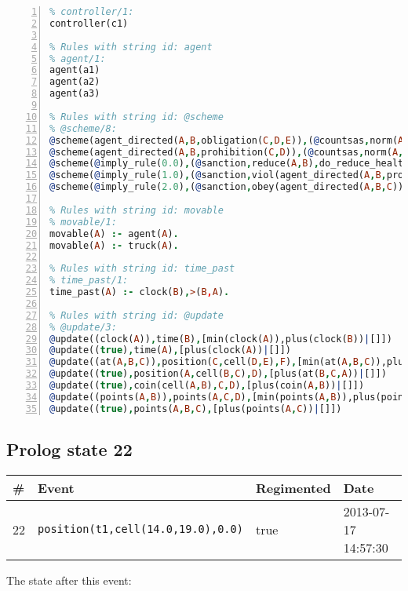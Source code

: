 \documentclass[11pt]{article}\usepackage[utf8]{inputenc}\usepackage{geometry}
\begin{document}
\begin{lstlisting}[language=Prolog, numbers=left]
% Rules with string id: controller
% controller/1:
controller(c1)

% Rules with string id: agent
% agent/1:
agent(a1)
agent(a2)
agent(a3)

% Rules with string id: @scheme
% @scheme/8:
@scheme(agent_directed(A,B,obligation(C,D,E)),(@countsas,norm(A,B,F,obligation(C,D,E)),F),false,(listTrue(C)),(time_past(D)),false,[plus(viol(agent_directed(A,B,obligation(C,D,E))))|[]],[plus(obey(agent_directed(A,B,obligation(C,D,E))))|[]])
@scheme(agent_directed(A,B,prohibition(C,D)),(@countsas,norm(A,B,E,prohibition(C,D)),E),(listTrue(C)),false,(false),false,[plus(viol(agent_directed(A,B,prohibition(C,D))))|[]],[plus(obey(agent_directed(A,B,prohibition(C,D))))|[]])
@scheme(@imply_rule(0.0),(@sanction,reduce(A,B),do_reduce_health(A,B),notifyAgent(A,changed(status))),true,false,false,false,[min(reduce(A,B))|[]],[])
@scheme(@imply_rule(1.0),(@sanction,viol(agent_directed(A,B,prohibition(C,D))),do_sanction(D)),true,false,false,false,[min(viol(agent_directed(A,B,prohibition(C,D))))|[]],[])
@scheme(@imply_rule(2.0),(@sanction,obey(agent_directed(A,B,C))),true,false,false,false,[min(obey(agent_directed(A,B,C)))|[]],[])

% Rules with string id: movable
% movable/1:
movable(A) :- agent(A).
movable(A) :- truck(A).

% Rules with string id: time_past
% time_past/1:
time_past(A) :- clock(B),>(B,A).

% Rules with string id: @update
% @update/3:
@update((clock(A)),time(B),[min(clock(A)),plus(clock(B))|[]])
@update((true),time(A),[plus(clock(A))|[]])
@update((at(A,B,C)),position(C,cell(D,E),F),[min(at(A,B,C)),plus(at(D,E,C))|[]])
@update((true),position(A,cell(B,C),D),[plus(at(B,C,A))|[]])
@update((true),coin(cell(A,B),C,D),[plus(coin(A,B))|[]])
@update((points(A,B)),points(A,C,D),[min(points(A,B)),plus(points(A,D))|[]])
@update((true),points(A,B,C),[plus(points(A,C))|[]])

\end{lstlisting}
\clearpage 
\subsection{Prolog state 22}
\begin{table}[ht]
\centering 
\begin{tabular}{l l l l} 
\textbf{\#} & \textbf{Event} & \textbf{Regimented} & \textbf{Date} \\ [0.5ex] 
\hline
22&\texttt{position(t1,cell(14.0,19.0),0.0)}&true&2013-07-17 14:57:30\\ [1ex] \hline\end{tabular}
\end{table}
The state after this event:
\end{document}
